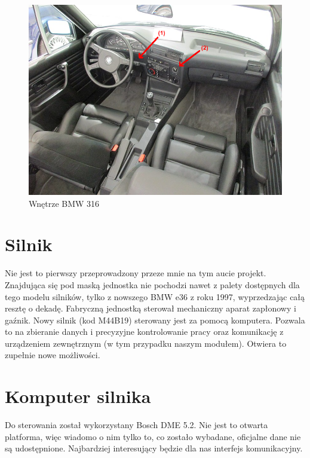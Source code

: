 \documentclass[declaration,shortabstract, inz]{iithesis}
\begin{document}
\begin{figure}[htp]
    \centering
    \includegraphics[width=12cm]{images/bmw_e30_interior_marked.png}
    \caption{Wnętrze BMW 316}
    \label{fig:e30_interior}
\end{figure}
\FloatBarrier

\section{Silnik}
Nie jest to pierwszy przeprowadzony przeze mnie na tym aucie projekt. Znajdująca się pod maską jednostka nie pochodzi nawet z palety dostępnych dla tego modelu silników, tylko z nowszego BMW e36 z roku 1997, wyprzedzając całą resztę o dekadę. Fabryczną jednostką sterował mechaniczny aparat zapłonowy i gaźnik. Nowy silnik (kod M44B19) sterowany jest za pomocą komputera. Pozwala to na zbieranie danych i precyzyjne kontrolowanie pracy oraz komunikację z urządzeniem zewnętrznym (w tym przypadku naszym modułem). Otwiera to zupełnie nowe możliwości.

\section{Komputer silnika}
Do sterowania został wykorzystany Bosch DME 5.2. Nie jest to otwarta platforma, więc wiadomo o nim tylko to, co zostało wybadane, oficjalne dane nie są udostępnione. Najbardziej interesujący będzie dla nas interfejs komunikacyjny. 

\end{document}
